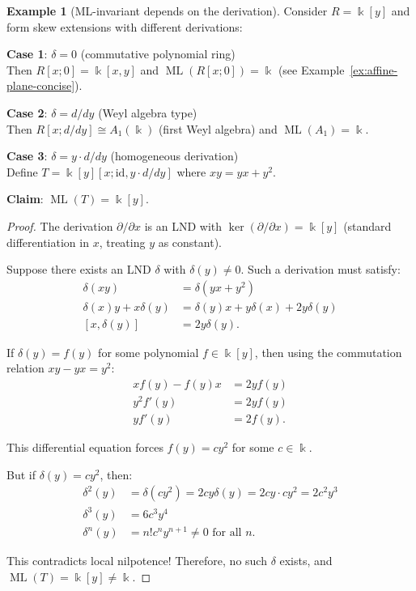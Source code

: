 \documentclass{amsart}
\theoremstyle{plain}
\numberwithin{theorem}{section}
\numberwithin{equation}{theorem}
\theoremstyle{definition}
\newtheorem{example}[theorem]{Example}
\DeclareMathOperator{\ML}{ML}
\begin{document}
\begin{example}[ML-invariant depends on the derivation]
\label{ex:skew-obstruction}
Consider $R = \Bbbk[y]$ and form skew extensions with different derivations:

\textbf{Case 1}: $\delta = 0$ (commutative polynomial ring)\\
Then $R[x;0] = \Bbbk[x,y]$ and $\ML(R[x;0]) = \Bbbk$ (see Example~\ref{ex:affine-plane-concise}).

\textbf{Case 2}: $\delta = d/dy$ (Weyl algebra type)\\  
Then $R[x; d/dy] \cong A_1(\Bbbk)$ (first Weyl algebra) and $\ML(A_1) = \Bbbk$.

\textbf{Case 3}: $\delta = y \cdot d/dy$ (homogeneous derivation)\\
Define $T = \Bbbk[y][x; \text{id}, y \cdot d/dy]$ where $xy = yx + y^2$.

\textbf{Claim}: $\ML(T) = \Bbbk[y]$.

\begin{proof}
The derivation $\partial/\partial x$ is an LND with $\ker(\partial/\partial x) = \Bbbk[y]$ (standard differentiation in $x$, treating $y$ as constant).

Suppose there exists an LND $\delta$ with $\delta(y) \neq 0$. Such a derivation must satisfy:
\begin{align*}
\delta(xy) &= \delta(yx + y^2)\\
\delta(x)y + x\delta(y) &= \delta(y)x + y\delta(x) + 2y\delta(y)\\
[x, \delta(y)] &= 2y\delta(y).
\end{align*}

If $\delta(y) = f(y)$ for some polynomial $f \in \Bbbk[y]$, then using the commutation relation $xy - yx = y^2$:
\begin{align*}
xf(y) - f(y)x &= 2yf(y)\\
y^2f'(y) &= 2yf(y)\\
yf'(y) &= 2f(y).
\end{align*}

This differential equation forces $f(y) = cy^2$ for some $c \in \Bbbk$.

But if $\delta(y) = cy^2$, then:
\begin{align*}
\delta^2(y) &= \delta(cy^2) = 2cy\delta(y) = 2cy \cdot cy^2 = 2c^2y^3\\
\delta^3(y) &= 6c^3y^4\\
\delta^n(y) &= n! c^n y^{n+1} \neq 0 \text{ for all } n.
\end{align*}

This contradicts local nilpotence! Therefore, no such $\delta$ exists, and $\ML(T) = \Bbbk[y] \neq \Bbbk$.
\end{proof}
\end{example}
\end{document}

